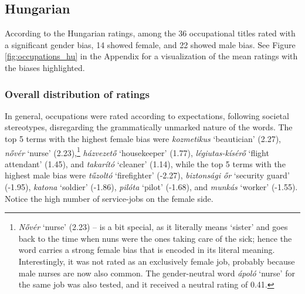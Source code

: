 \documentclass[11pt]{article}
\begin{document}
\subsection{Hungarian}



According to the Hungarian ratings, among the 36 occupational titles rated with a significant gender bias, 14 showed female, and 22 showed male bias. See Figure \ref{fig:occupations_hu} in the Appendix for a visualization of the mean ratings with the biases highlighted.

\subsubsection{Overall distribution of ratings}

In general, occupations were rated according to expectations, following societal stereotypes, disregarding the grammatically unmarked nature of the words. The top 5 terms with the highest female bias were \textit{kozmetikus} `beautician' (2.27), \textit{nővér} `nurse' (2.23),\footnote{\textit{Nővér} `nurse' (2.23) -- is a bit special, as it literally means `sister' and goes back to the time when nuns were the ones taking care of the sick; hence the word carries a strong female bias that is encoded in its literal meaning. Interestingly, it was not rated as an exclusively female job, probably because male nurses are now also common. The gender-neutral word \textit{ápoló} `nurse' for the same job was also tested, and it received a neutral rating of 0.41.} \textit{házvezető} `housekeeper' (1.77), \textit{légiutas-kísérő} `flight attendant' (1.45), and \textit{takarító} `cleaner' (1.14), while the top 5 terms with the highest male bias were \textit{tűzoltó} `firefighter' (-2.27), \textit{biztonsági őr} `security guard' (-1.95), \textit{katona} `soldier' (-1.86), \textit{pilóta} `pilot' (-1.68), and \textit{munkás} `worker' (-1.55). Notice the high number of service-jobs on the female side.
\end{document}
